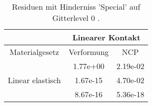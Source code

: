 \begin{table} 
\centering 
\begin{tabular}{c|cc|} 
\cline{2-3} 
 & \multicolumn{2}{|c|}{Linearer Kontakt} \\ 
\hline 
\multicolumn{1}{|c|}{Materialgesetz} & \multicolumn{1}{c|}{Verformung} & \multicolumn{1}{c|}{NCP} \\ 
\hline 
\multicolumn{1}{|c|}{\multirow{3}{*}{Linear elastisch}} &\multicolumn{1}{|c|}{  1.77e+00} & \multicolumn{1}{|c|}{  2.19e-02} \\ 
\multicolumn{1}{|c|}{} & \multicolumn{1}{|c|}{  1.67e-15} & \multicolumn{1}{|c|}{  4.70e-02} \\ 
\multicolumn{1}{|c|}{} & \multicolumn{1}{|c|}{  8.67e-16} & \multicolumn{1}{|c|}{  5.36e-18} \\ 
\hline 
\end{tabular}\caption{Residuen mit Hinderniss 'Special' auf Gitterlevel 0 .}\label{tab:Residuum_Special_level0}
\end{table} 
